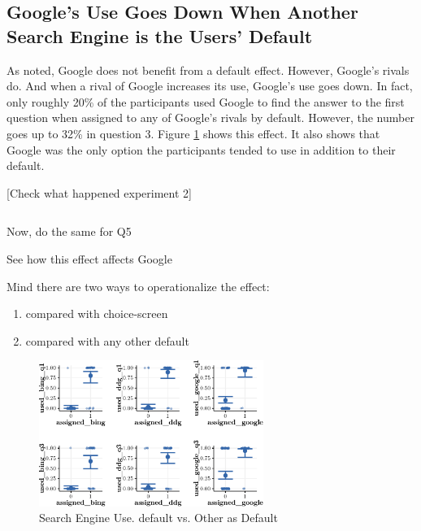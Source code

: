 \documentclass[
  11pt,
]{article}
\begin{document}
\hypertarget{googles-use-goes-down-when-another-search-engine-is-the-users-default}{%
\subsection{Google's Use Goes Down When Another Search Engine is the Users' Default}\label{googles-use-goes-down-when-another-search-engine-is-the-users-default}}

As noted, Google does not benefit from a default effect. However, Google's rivals do. And when a rival of Google increases its use, Google's use goes down. In fact, only roughly 20\% of the participants used Google to find the answer to the first question when assigned to any of Google's rivals by default. However, the number goes up to 32\% in question 3. Figure \ref{fig:Sqsearchb} shows this effect. It also shows that Google was the only option the participants tended to use in addition to their default.

{[}Check what happened experiment 2{]}

\begin{verbatim}
\end{verbatim}

Now, do the same for Q5

See how this effect affects Google

Mind there are two ways to operationalize the effect:

\begin{enumerate}
\def\labelenumi{\arabic{enumi})}
\item
  compared with choice-screen
\item
  compared with any other default
\end{enumerate}

\begin{figure}

{\centering \includegraphics[width=0.65\textwidth]{Results-July19-307_files/figure-latex/Sqsearchb-1} 

}

\caption{Search Engine Use. default vs. Other as Default}\label{fig:Sqsearchb}
\end{figure}
\end{document}
